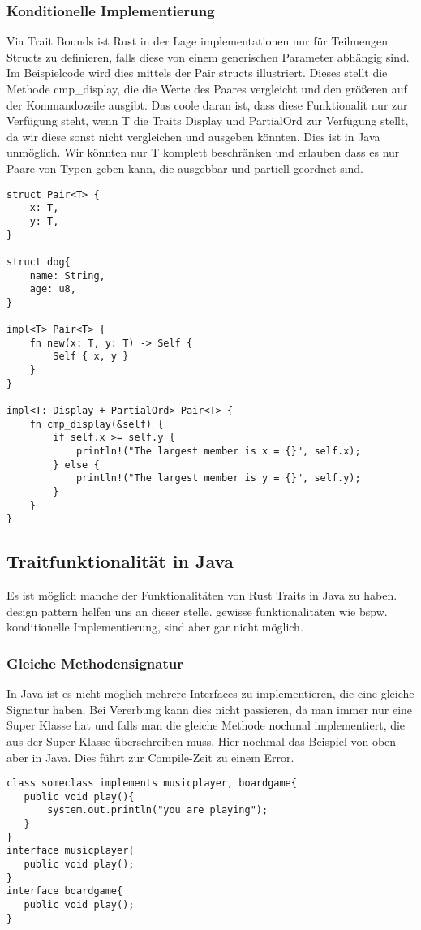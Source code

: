 \documentclass[a4paper, 1ppt]{article}
\begin{document}
\subsubsection{Konditionelle Implementierung}
Via Trait Bounds ist Rust in der Lage implementationen nur für Teilmengen Structs zu definieren, falls diese von einem generischen Parameter abhängig sind.
Im Beispielcode wird dies mittels der Pair structs illustriert. Dieses stellt die Methode cmp\_display, die die Werte des Paares vergleicht und den größeren auf der Kommandozeile ausgibt.
Das coole daran ist, dass diese Funktionalit nur zur Verfügung steht, wenn T die Traits Display und PartialOrd zur Verfügung stellt, da wir diese sonst nicht vergleichen und ausgeben könnten.
Dies ist in Java unmöglich. Wir könnten nur T komplett beschränken und erlauben dass es nur Paare von Typen geben kann, die ausgebbar und partiell geordnet sind.
\begin{verbatim}
struct Pair<T> {
    x: T,
    y: T,
}

struct dog{
    name: String,
    age: u8,
}

impl<T> Pair<T> {
    fn new(x: T, y: T) -> Self {
        Self { x, y }
    }
}

impl<T: Display + PartialOrd> Pair<T> {
    fn cmp_display(&self) {
        if self.x >= self.y {
            println!("The largest member is x = {}", self.x);
        } else {
            println!("The largest member is y = {}", self.y);
        }
    }
}
\end{verbatim}
\subsection{Traitfunktionalität in Java}
Es ist möglich manche der Funktionalitäten von Rust Traits in Java zu haben.
design pattern\cite{websitedesignpatterns} helfen uns an dieser stelle. gewisse funktionalitäten wie bspw. konditionelle Implementierung, sind aber gar nicht möglich.
\subsubsection{Gleiche Methodensignatur}
In Java ist es nicht möglich mehrere Interfaces zu implementieren, die eine gleiche Signatur haben.
Bei Vererbung kann dies nicht passieren, da man immer nur eine Super Klasse hat und falls man die gleiche Methode nochmal implementiert, die aus der Super-Klasse überschreiben muss.
Hier nochmal das Beispiel von oben aber in Java. Dies führt zur Compile-Zeit zu einem Error.
\begin{verbatim}
class someclass implements musicplayer, boardgame{
   public void play(){
       system.out.println("you are playing");
   }
}
interface musicplayer{
   public void play();
}
interface boardgame{
   public void play();
}
\end{verbatim}
\end{document}
